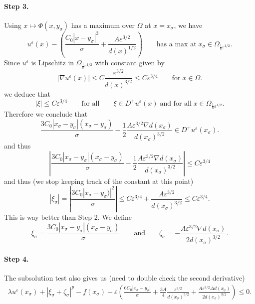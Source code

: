 \documentclass[11pt,reqno]{amsart}
\numberwithin{figure}{section}
\theoremstyle{plain}
\theoremstyle{remark}
\numberwithin{equation}{section}
\begin{document}
\paragraph{Step 3.} Using $x\mapsto \Phi(x,y_\sigma)$ has a maximum over $\Omega$ at $x=x_\sigma$, we have
\begin{equation*}
    u^\varepsilon(x) - \left(\frac{C_0|x-y_\sigma|^3}{\sigma}  + \frac{A\varepsilon^{3/2}}{d(x)^{1/2}}\right) \qquad\text{has a max at}\;x_\sigma \in \Omega_{\frac{1}{8}\varepsilon^{1/2}}.
\end{equation*}
Since $u^\varepsilon$ is Lipschitz in $\Omega_{\frac{1}{8}\varepsilon^{1/2}}$ with constant given by 
\begin{equation*}
|\nabla u^\varepsilon(x)|  \leq C\frac{\varepsilon^{3/2}}{d(x)^{3/2}} \leq C\varepsilon^{3/4} \qquad\text{for}\;x\in \Omega.
\end{equation*}
we deduce that 
\begin{equation*}
    |\xi|\leq C\varepsilon^{3/4} \qquad\text{for all}\qquad \xi\in D^+u^\varepsilon(x)\;\text{and for all}\; x\in \Omega_{\frac{1}{8}\varepsilon^{1/2}}.
\end{equation*}
Therefore we conclude that
\begin{equation*}
    \frac{3C_0|x_\sigma-y_\sigma|(x_\sigma-y_\sigma)}{\sigma} -\frac{1}{2}\frac{A\varepsilon^{3/2}\nabla d(x_\sigma)}{d(x_\sigma)^{3/2}} \in D^+u^\varepsilon(x_\sigma).
\end{equation*}
and thus
\begin{equation*}
    \left|\frac{3C_0|x_\sigma-y_\sigma|(x_\sigma-y_\sigma)}{\sigma} -\frac{1}{2}\frac{A\varepsilon^{3/2}\nabla d(x_\sigma)}{d(x_\sigma)^{3/2}}\right| \leq C\varepsilon^{3/4}
\end{equation*}
and thus (we stop keeping track of the constant at this point)
\begin{equation*}
    |\xi_\sigma| = \left|\frac{3C_0|x_\sigma - y_\sigma)|^2}{\sigma}\right| \leq C\varepsilon^{3/4}  + \frac{A\varepsilon^{3/2}}{d(x_\sigma)^{3/2}} \leq C\varepsilon^{3/4}.
\end{equation*}
This is way better than Step 2. We define
\begin{equation*}
    \xi_\sigma = \frac{3C_0|x_\sigma - y_\sigma|(x_\sigma - y_\sigma)}{\sigma} \qquad\text{and}\qquad \zeta_\sigma =-\frac{A\varepsilon^{3/2}\nabla d(x_\sigma)}{2d(x_\sigma)^{3/2}}.
\end{equation*}
\paragraph{Step 4.} The subsolution test also gives us (need to double check the second derivative)
\begin{align}\label{e:subb1}
    \lambda u^\varepsilon(x_\sigma) + |\xi_\sigma+\zeta_\sigma|^p - f(x_\sigma) -  \varepsilon \left(\frac{6C_0|x_\sigma - y_\sigma|}{\sigma} + \frac{3A}{4}\frac{\varepsilon^{3/2}}{d(x_\sigma)^{5/2}} + \frac{A\varepsilon^{3/2}\Delta d(x_\sigma)}{2d(x_\sigma)^{3/2}}\right) \leq 0.
\end{align}
\end{document}

